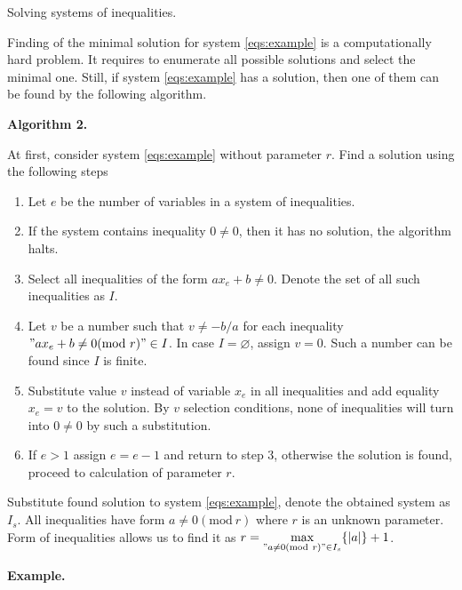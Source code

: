 \documentclass[leqno]{aadmbook}
\renewcommand{\mod}[1]{\textrm{mod}\ #1}
\begin{document}

\vspace{1.5cc}
\begin{section}
{Solving systems of inequalities.}

Finding of the minimal solution for system \eqref{eqs:example} is a computationally hard problem. It requires to enumerate all possible solutions and select the minimal one. Still, if system \eqref{eqs:example} has a solution, then one of them can be found by the following algorithm.

\textbf{Algorithm 2.}

At first, consider system \eqref{eqs:example} without parameter $r$. Find a solution using the following steps

\begin{enumerate}
    \item Let $e$ be the number of variables in a system of inequalities.
    \item If the system contains inequality $0 \neq 0$, then it has no solution, the algorithm halts.
    \item Select all inequalities of the form $a x_e + b \neq 0$. Denote the set of all such inequalities as $I$.
    \item Let $v$ be a number such that $v \neq -b/a $ for each inequality $"a x_e + b \neq 0 (\mod{r})" \in I$. In case $I = \varnothing$, assign $v = 0$. Such a number can be found since $I$ is finite.
    \item Substitute value $v$ instead of variable $x_e$ in all inequalities and add equality $x_e = v$ to the solution. By $v$ selection conditions, none of inequalities will turn into $0 \neq 0$ by such a substitution. 
    \item If $e > 1$ assign $e = e - 1$ and return to step 3, otherwise the solution is found, proceed to calculation of parameter $r$.
\end{enumerate}

Substitute found solution to system \eqref{eqs:example}, denote the obtained system as $I_s$. All inequalities have form $a \neq 0 (\mod{r})$ where $r$ is an unknown parameter. Form of inequalities allows us to find it as $r = \max\limits_{"a \neq 0 (\mod{r})" \in I_s}\{ |a| \} + 1$.

\textbf{Example.}


\end{section}
\end{document}
